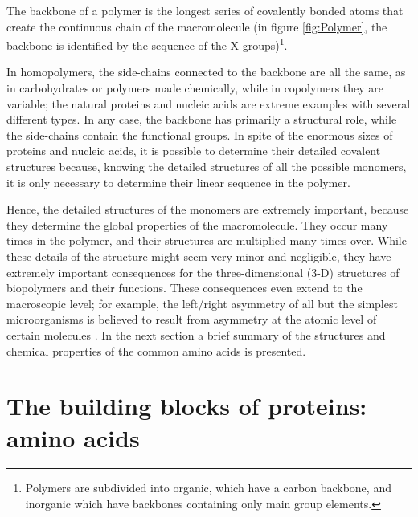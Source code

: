 The backbone of a polymer is the longest series of covalently bonded atoms that create the continuous chain of the macromolecule (in figure \ref{fig:Polymer}, the backbone is identified by the sequence of the X groups)\footnote{Polymers are subdivided into organic, which have a carbon backbone, and inorganic which have backbones containing only main group elements.}. %

In homopolymers, the side-chains connected to the backbone are all the same, as in carbohydrates or polymers made chemically, while in copolymers they are variable; the natural proteins and nucleic acids are extreme examples with several different types. In any case, the backbone has primarily a structural role, while the side-chains contain the functional groups. In spite of the enormous sizes of proteins and nucleic acids, it is possible to determine their detailed covalent structures because, knowing the detailed structures of all the possible monomers, it is only necessary to determine their linear sequence in the polymer.

Hence, the detailed structures of the monomers are extremely important, because they determine the global properties of the macromolecule. They occur many times in the polymer, and their structures are multiplied many times over. While these details of the structure might seem very minor and negligible, they have extremely important consequences for the three-dimensional (3-D) structures of biopolymers and their functions. These consequences even extend to the macroscopic level; for example, the left/right asymmetry of all but the simplest microorganisms is believed to result from asymmetry at the atomic level of certain molecules
\cite{creighton2010biophysical}. In the next section a brief summary of the structures and chemical properties of the common amino acids is presented. 

\section{The building blocks of proteins: amino acids}\label{sec:amino-acids}

